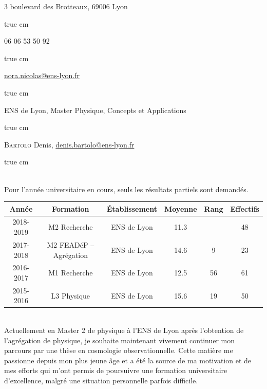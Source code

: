 \documentclass[11pt,a4]{article}
\begin{document}

3 boulevard des Brotteaux, 69006 Lyon

 true cm

06 06 53 50 92

 true cm

\href{mailto:nora.nicolas@ens-lyon.fr}{nora.nicolas@ens-lyon.fr}

 true cm

ENS de Lyon, Master Physique, Concepts et Applications

 true cm

\textsc{Bartolo} Denis, \href{mailto:denis.bartolo@ens-lyon.fr}{denis.bartolo@ens-lyon.fr}

 true cm

 \\ Pour l'année universitaire en cours, seuls les résultats
partiels sont demandés.

\begin{center}
    \begin{tabular}{|c|c|c|c|c|c|} \cline{1-6}
        Année     & Formation               & Établissement & Moyenne & Rang & Effectifs \\ \hline
        2018-2019 & M2 Recherche            & ENS de Lyon   & 11.3    &      & 48 \\ \hline
        2017-2018 & M2 FEADéP -- Agrégation & ENS de Lyon   & 14.6    & 9    & 23 \\ \hline
        2016-2017 & M1 Recherche            & ENS de Lyon   & 12.5    & 56   & 61 \\ \hline
        2015-2016 & L3 Physique             & ENS de Lyon   & 15.6    & 19   & 50 \\ \hline
    \end{tabular}
\end{center}

\newpage
{}\\

Actuellement en Master 2 de physique à l'ENS de Lyon après l'obtention de l'agrégation de physique,
je souhaite maintenant vivement continuer mon parcours par une thèse en cosmologie observationnelle.
Cette matière me passionne depuis mon plus jeune âge et a été la source de ma motivation et de mes
efforts qui m'ont permis de poursuivre une formation universitaire d'excellence, malgré une
situation personnelle parfois difficile. 
\end{document}
